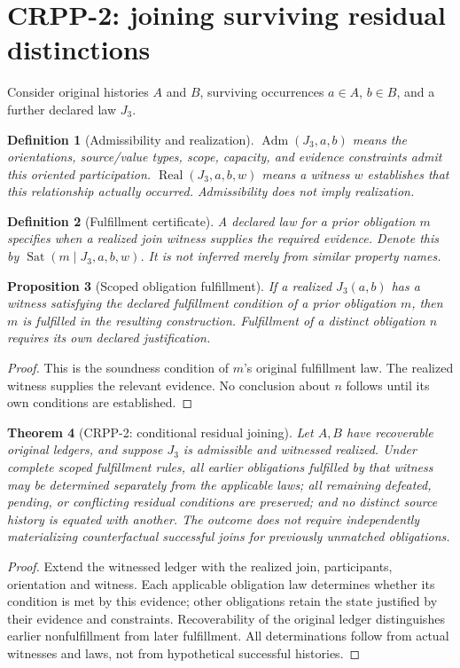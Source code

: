 \documentclass[11pt]{article}
\newtheorem{definition}{Definition}[section]
\newtheorem{proposition}[definition]{Proposition}
\newtheorem{theorem}[definition]{Theorem}
\newcommand{\Sat}{\operatorname{Sat}}
\newcommand{\Adm}{\operatorname{Adm}}
\newcommand{\Real}{\operatorname{Real}}
\begin{document}
\section{CRPP-2: joining surviving residual distinctions}
Consider original histories $A$ and $B$, surviving occurrences
$a\in A$, $b\in B$, and a further declared law $J_3$.

\begin{definition}[Admissibility and realization]
$\Adm(J_3,a,b)$ means the orientations, source/value types, scope, capacity,
and evidence constraints admit this oriented participation.
$\Real(J_3,a,b,w)$ means a witness $w$ establishes that this relationship
\emph{actually occurred}. Admissibility does not imply realization.
\end{definition}

\begin{definition}[Fulfillment certificate]
A declared law for a prior obligation $m$ specifies when a realized
join witness supplies the required evidence. Denote this by
$\Sat(m\mid J_3,a,b,w)$. It is not inferred merely from similar
property names.
\end{definition}

\begin{proposition}[Scoped obligation fulfillment]
If a realized $J_3(a,b)$ has a witness satisfying the declared
fulfillment condition of a prior obligation $m$, then $m$ is
fulfilled in the resulting construction. Fulfillment of a distinct
obligation $n$ requires its own declared justification.
\end{proposition}
\begin{proof}
This is the soundness condition of $m$'s original fulfillment law.
The realized witness supplies the relevant evidence. No conclusion
about $n$ follows until its own conditions are established.
\end{proof}

\begin{theorem}[CRPP-2: conditional residual joining]
Let $A,B$ have recoverable original ledgers, and suppose $J_3$ is
admissible and \emph{witnessed realized}. Under complete scoped
fulfillment rules, all earlier obligations fulfilled by that witness
may be determined separately from the applicable laws; all remaining
defeated, pending, or conflicting residual conditions are preserved;
and no distinct source history is equated with another. The outcome
does not require independently materializing counterfactual successful
joins for previously unmatched obligations.
\end{theorem}
\begin{proof}
Extend the witnessed ledger with the realized join, participants,
orientation and witness. Each applicable obligation law determines
whether its condition is met by this evidence; other obligations
retain the state justified by their evidence and constraints.
Recoverability of the original ledger distinguishes earlier
nonfulfillment from later fulfillment. All determinations follow
from actual witnesses and laws, not from hypothetical successful
histories.
\end{proof}
\end{document}
